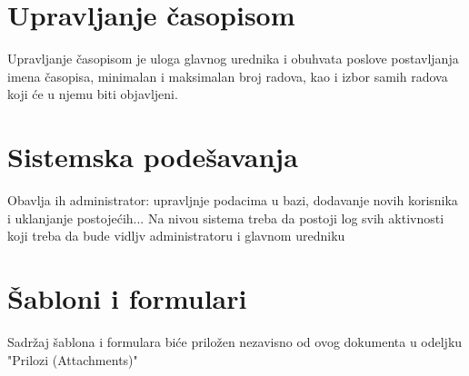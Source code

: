 \documentclass[a4paper,14,4pt]{article}
\begin{document}
\section{Upravljanje časopisom}
Upravljanje časopisom je uloga glavnog urednika i obuhvata poslove postavljanja imena časopisa, minimalan i maksimalan broj radova, kao i izbor samih radova koji će u njemu biti objavljeni.
\section{Sistemska podešavanja}
Obavlja ih administrator: upravljnje podacima u bazi, dodavanje novih korisnika i uklanjanje postojećih... Na nivou sistema treba da postoji log svih aktivnosti koji treba da bude vidljv administratoru i glavnom uredniku

\section{Šabloni i formulari}
Sadržaj šablona i formulara biće priložen nezavisno od ovog dokumenta u odeljku "Prilozi (Attachments)"
\end{document}
